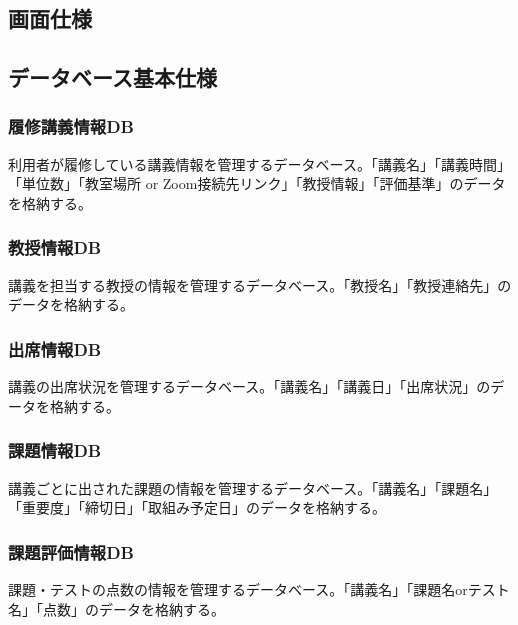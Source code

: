 \documentclass[a4paper, 11pt, titlepage]{jsarticle}
\begin{document}
\subsection{画面仕様}

\subsection{データベース基本仕様}
\subsubsection{履修講義情報DB}
利用者が履修している講義情報を管理するデータベース。「講義名」「講義時間」「単位数」「教室場所 or Zoom接続先リンク」「教授情報」「評価基準」のデータを格納する。
\subsubsection{教授情報DB}
講義を担当する教授の情報を管理するデータベース。「教授名」「教授連絡先」のデータを格納する。
\subsubsection{出席情報DB}
講義の出席状況を管理するデータベース。「講義名」「講義日」「出席状況」のデータを格納する。
\subsubsection{課題情報DB}
講義ごとに出された課題の情報を管理するデータベース。「講義名」「課題名」「重要度」「締切日」「取組み予定日」のデータを格納する。
\subsubsection{課題評価情報DB}
課題・テストの点数の情報を管理するデータベース。「講義名」「課題名orテスト名」「点数」のデータを格納する。
\end{document}
